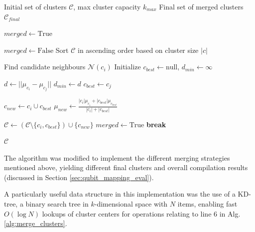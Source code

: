 \begin{algorithm}
\caption{Greedy Merging of Underfilled Clusters}
\label{alg:merge_clusters}
\begin{algorithmic}[1]
    \REQUIRE Initial set of clusters $\mathcal{C}$, max cluster capacity $k_{max}$
    \ENSURE Final set of merged clusters $\mathcal{C}_{final}$
    
    \STATE $merged \leftarrow \text{True}$
    
        \STATE $merged \leftarrow \text{False}$
        \STATE Sort $\mathcal{C}$ in ascending order based on cluster size $|c|$
        
            \STATE Find candidate neighbours $\mathcal{N}(c_i)$ 
            \STATE Initialize $c_{best} \leftarrow \text{null}$, $d_{min} \leftarrow \infty$
            
                    \STATE $d \leftarrow ||\mu_{c_i} - \mu_{c_j}||$
                        \STATE $d_{min} \leftarrow d$
                        \STATE $c_{best} \leftarrow c_j$
                    \ENDIF
                \ENDIF
            \ENDFOR
            
                \STATE $c_{new} \leftarrow c_i \cup c_{best}$ 
                \STATE $\mu_{new} \leftarrow \frac{|c_i|\mu_{c_i} + |c_{best}|\mu_{c_{best}}}{|c_i| + |c_{best}|}$ 
                
                \STATE $\mathcal{C} \leftarrow (\mathcal{C} \setminus \{c_i, c_{best}\}) \cup \{c_{new}\}$
                \STATE $merged \leftarrow \text{True}$
                \STATE \textbf{break}
            \ENDIF
        \ENDFOR
    \ENDWHILE
    
    \RETURN $\mathcal{C}$
\end{algorithmic}
\end{algorithm}

The algorithm was modified to implement the different merging strategies mentioned above, yielding different final clusters and overall compilation results (discussed in Section \ref{sec:qubit_mapping_eval}).

A particularly useful data structure in this implementation was the use of a KD-tree, a binary search tree in $k$-dimensional space with $N$ items, enabling fast $O(\log N)$ lookups of cluster centers for operations relating to line 6 in Alg. \ref{alg:merge_clusters}. 

